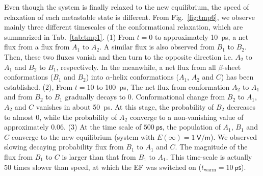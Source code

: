 \documentclass[a4paper,preprint,unsortedaddress,onecolumn]{revtex4-1}
\begin{document}
Even though the system is finally relaxed to the new equilibrium,
the speed of relaxation of each metastable state is different. 
From Fig.~\ref{fig:tmp6}, we observe mainly
three different timescales of the conformational relaxation, which
are summarized in Tab.~\ref{tab:tmp1}.
(1) From
$t=0$ to approximately 10~\textsf{ps}, a net flux from 
a flux from $A_1$ to $A_2$.
A similar flux is also observed from $B_1$ to $B_2$.
Then, these two fluxes vanish and then turn to the opposite direction
i.e. $A_2$ to $A_1$ and $B_2$ to $B_1$, respectively.
In the meanwhile, a net flux from all $\beta$-sheet conformations
($B_1$ and $B_2$) into $\alpha$-helix conformations ($A_1$, $A_2$ and
$C$) has been established.
(2), From $t=10$ to
100~\textsf{ps},
The net flux from  conformation $A_2$ to $A_1$ and from $B_2$ to $B_1$
gradually decays to 0. Conformational change from $B_2$ to $A_1$, $A_2$ and $C$
vanishes in about 50~ps.
At this stage, the probability of $B_2$ decreases to almost 0,
while the probability of $A_2$
converge to a non-vanishing value of approximately 0.06.
(3) At the time scale of $
500~\textsf{ps}$, the population of $A_1$, $B_1$ and $C$ converge to
the new equilibrium (system with $E(\infty) = 1~\textsf{V/m}$).
We observed slowing decaying probability flux from $B_1$ 
to $A_1$ and $C$.
The magnitude of the flux from $B_1$ to  $C$ is larger than that from  $B_1$ to  $A_1$.
This time-scale is actually 50 times slower than speed, at which
the EF was switched on ($t_{\textrm{warm}} = 10~\textsf{ps}$).
\end{document}
